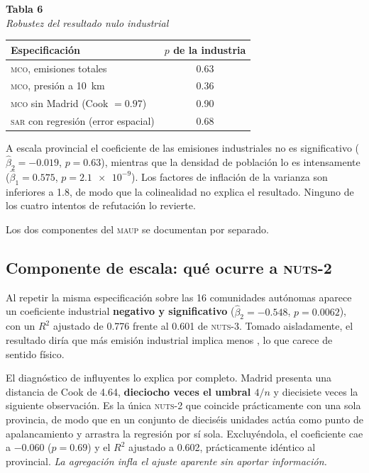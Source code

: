 \documentclass[11pt,a4paper]{article}
\newcommand{\rotulo}[2]{%
  \vspace{4pt}\noindent\textbf{#1}\\[2pt]\emph{#2}\\[4pt]}
\begin{document}
\rotulo{Tabla 6}{Robustez del resultado nulo industrial}

\begin{center}
\small
\begin{tabular}{@{}lc@{}}
\toprule
\textbf{Especificación} & \textbf{$p$ de la industria} \\
\midrule
\textsc{mco}, emisiones totales & \num{0.63} \\
\textsc{mco}, presión a \SI{10}{\kilo\metre} & \num{0.36} \\
\textsc{mco} sin Madrid (Cook $=\num{0.97}$) & \num{0.90} \\
\textsc{sar} con regresión (error espacial) & \num{0.68} \\
\bottomrule
\end{tabular}
\end{center}

A escala provincial el coeficiente de las emisiones industriales no es
significativo ($\hat\beta_2=\num{-0.019}$, $p=\num{0.63}$), mientras que la
densidad de población lo es intensamente ($\hat\beta_1=\num{0.575}$,
$p=\num{2.1e-9}$). Los factores de inflación de la varianza son inferiores a
\num{1.8}, de modo que la colinealidad no explica el resultado. Ninguno de los
cuatro intentos de refutación lo revierte.

Los dos componentes del \textsc{maup} se documentan por separado.

\subsection*{Componente de escala: qué ocurre a \textsc{nuts}-2}

Al repetir la misma especificación sobre las \num{16} comunidades autónomas
aparece un coeficiente industrial \textbf{negativo y significativo}
($\hat\beta_2=\num{-0.548}$, $p=\num{0.0062}$), con un $R^2$ ajustado de
\num{0.776} frente al \num{0.601} de \textsc{nuts}-3. Tomado aisladamente, el
resultado diría que más emisión industrial implica menos , lo que
carece de sentido físico.

El diagnóstico de influyentes lo explica por completo. Madrid presenta una
distancia de Cook de \num{4.64}, \textbf{dieciocho veces el umbral $4/n$} y
diecisiete veces la siguiente observación. Es la única \textsc{nuts}-2 que
coincide prácticamente con una sola provincia, de modo que en un conjunto de
dieciséis unidades actúa como punto de apalancamiento y arrastra la regresión
por sí sola. Excluyéndola, el coeficiente cae a \num{-0.060}
($p=\num{0.69}$) y el $R^2$ ajustado a \num{0.602}, prácticamente idéntico al
provincial. \emph{La agregación infla el ajuste aparente sin aportar
información.}
\end{document}
